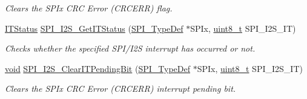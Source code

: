 \begin{DoxyCompactItemize}
\begin{DoxyCompactList}\small\item\em Clears the S\+P\+Ix C\+RC Error (C\+R\+C\+E\+RR) flag. \end{DoxyCompactList}\item 
\hyperlink{agilefox_2library_2inc_2stm32f10x__type_8h_aacbd7ed539db0aacd973a0f6eca34074}{I\+T\+Status} \hyperlink{group___s_p_i___private___functions_ga72decbc1cd79f8fad92a2204beca6bc5}{S\+P\+I\+\_\+\+I2\+S\+\_\+\+Get\+I\+T\+Status} (\hyperlink{struct_s_p_i___type_def}{S\+P\+I\+\_\+\+Type\+Def} $\ast$S\+P\+Ix, \hyperlink{_p_e___types_8h_aba7bc1797add20fe3efdf37ced1182c5}{uint8\+\_\+t} S\+P\+I\+\_\+\+I2\+S\+\_\+\+IT)
\begin{DoxyCompactList}\small\item\em Checks whether the specified S\+P\+I/\+I2S interrupt has occurred or not. \end{DoxyCompactList}\item 
\hyperlink{usb__devapi_8h_afabf60e7f57651d6d595a02c75f07cd0}{void} \hyperlink{group___s_p_i___private___functions_ga35a524a49ff3d058137060f751e8749f}{S\+P\+I\+\_\+\+I2\+S\+\_\+\+Clear\+I\+T\+Pending\+Bit} (\hyperlink{struct_s_p_i___type_def}{S\+P\+I\+\_\+\+Type\+Def} $\ast$S\+P\+Ix, \hyperlink{_p_e___types_8h_aba7bc1797add20fe3efdf37ced1182c5}{uint8\+\_\+t} S\+P\+I\+\_\+\+I2\+S\+\_\+\+IT)
\begin{DoxyCompactList}\small\item\em Clears the S\+P\+Ix C\+RC Error (C\+R\+C\+E\+RR) interrupt pending bit. \end{DoxyCompactList}\end{DoxyCompactItemize}
